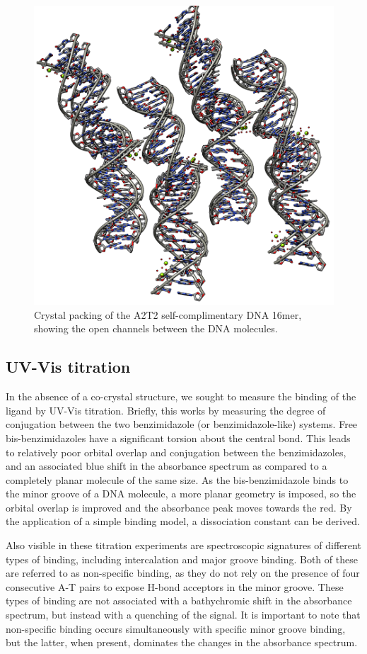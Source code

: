 \begin{refsection}
\begin{figure}
    \includegraphics[width=0.7\linewidth]{Figures/dna_oligo.png}
    \caption{Crystal packing of the A2T2 self-complimentary DNA 16mer, showing the open channels between the DNA molecules.}\label{fig:dna-oligo}
\end{figure}

\subsection{UV-Vis titration}\label{sec:absorbance}
In the absence of a co-crystal structure, we sought to measure the binding of the ligand by UV-Vis titration.
Briefly, this works by measuring the degree of conjugation between the two benzimidazole (or benzimidazole-like) systems.
Free bis-benzimidazoles have a significant torsion about the central bond.
This leads to relatively poor orbital overlap and conjugation between the benzimidazoles, and an associated blue shift in the absorbance spectrum as compared to a completely planar molecule of the same size.
As the bis-benzimidazole binds to the minor groove of a DNA molecule, a more planar geometry is imposed, so the orbital overlap is improved and the absorbance peak moves towards the red.
By the application of a simple binding model, a dissociation constant can be derived.

Also visible in these titration experiments are spectroscopic signatures of different types of binding, including intercalation and major groove binding.
Both of these are referred to as non-specific binding, as they do not rely on the presence of four consecutive A-T pairs to expose H-bond acceptors in the minor groove.
These types of binding are not associated with a bathychromic shift in the absorbance spectrum, but instead with a quenching of the signal.
It is important to note that non-specific binding occurs simultaneously with specific minor groove binding, but the latter, when present, dominates the changes in the absorbance spectrum.


\end{refsection}
